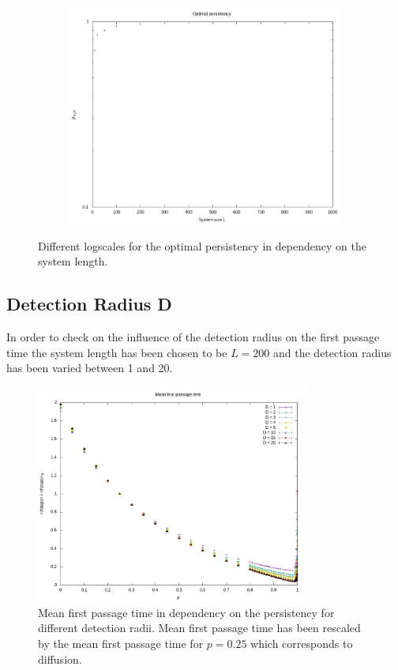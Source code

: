 \documentclass[]{scrartcl}
\begin{document}
\begin{figure}[!hbt]
\begin{subfigure}{0.35\textwidth}
 \includegraphics[width=\textwidth]{./fig/latt/L/p_opt_logy.png}
\end{subfigure}
\caption{Different logscales for the optimal persistency in dependency on the system length.} 
\label{fig:latt-L-p_opt-logscales}
\end{figure}


\subsection{Detection Radius D}
\label{ssec:latt-D}

In order to check on the influence of the detection radius on the first passage time the system length has been chosen to be $L = 200$ and the detection radius has been varied between 1 and 20.

\begin{figure}[!hbt]
 \centering
 \includegraphics[width=0.8\textwidth]{./fig/latt/D/fpt.png}
 \caption{Mean first passage time in dependency on the persistency for different detection radii. Mean first passage time has been rescaled by the mean first passage time for $p = 0.25$ which corresponds to diffusion.\label{fig:latt-D-fpt}}
\end{figure}
\end{document}
